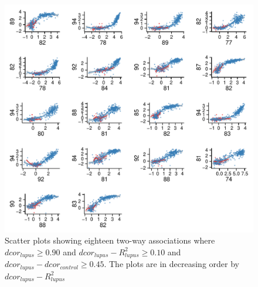 \documentclass[a4paper, 12pt]{report}
\begin{document}
\begin{figure}[H]
\begin{centering}
\includegraphics[width=\textwidth]{2wayTop.pdf}
\caption{Scatter plots showing eighteen two-way associations where $dcor_{lupus} \ge 0.90$ and $dcor_{lupus} - R^2_{lupus} \ge 0.10$ and $dcor_{lupus} -dcor_{control} \ge 0.45$. The plots are in decreasing order  by $dcor_{lupus} - R^2_{lupus}$} 
\label{F:2wayTop}
\end{centering}
\end{figure}
\end{document}

